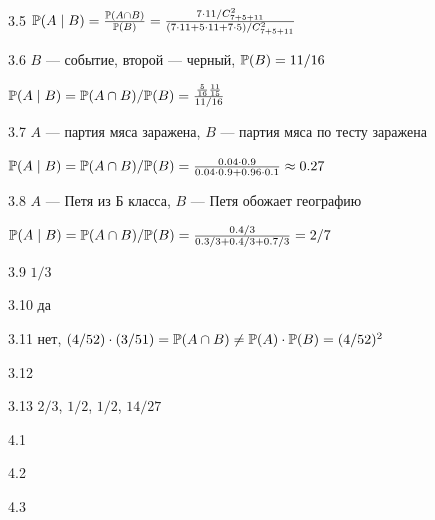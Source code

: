 \protect \hypertarget {soln:3.5}{}
\begin{solution}{{3.5}}
  $\P(A \mid B)=\frac{\P(A \cap B)}{\P(B)}= \frac{7\cdot 11 /C_{7+5+11}^2}{(7\cdot 11+5\cdot 11 + 7\cdot 5) /C_{7+5+11}^2 }$
\end{solution}
\protect \hypertarget {soln:3.6}{}
\begin{solution}{{3.6}}
  $B$ — событие, второй — черный, $\P(B)=11/16$

  $\P(A \mid B)=\P(A \cap B)/\P(B)=\frac{\frac{5}{16}\frac{11}{15}}{11/16}$
\end{solution}
\protect \hypertarget {soln:3.7}{}
\begin{solution}{{3.7}}
  $A$ — партия мяса заражена, $B$ — партия мяса по тесту заражена

  $\P(A \mid B)=\P(A \cap B)/\P(B)=\frac{0.04\cdot 0.9}{0.04\cdot 0.9+0.96\cdot 0.1}\approx 0.27$
\end{solution}
\protect \hypertarget {soln:3.8}{}
\begin{solution}{{3.8}}
  $A$ — Петя из Б класса, $B$ — Петя обожает географию

  $\P(A \mid B)=\P(A \cap B)/\P(B)=\frac{0.4/3}{0.3/3+0.4/3+0.7/3}=2/7$
\end{solution}
\protect \hypertarget {soln:3.9}{}
\begin{solution}{{3.9}}
  $1/3$
\end{solution}
\protect \hypertarget {soln:3.10}{}
\begin{solution}{{3.10}}
  да
\end{solution}
\protect \hypertarget {soln:3.11}{}
\begin{solution}{{3.11}}
  нет, $(4/52)\cdot (3/51)=\P(A\cap B) \neq \P(A)\cdot \P(B)=(4/52)^2$
\end{solution}
\protect \hypertarget {soln:3.12}{}
\begin{solution}{{3.12}}
\end{solution}
\protect \hypertarget {soln:3.13}{}
\begin{solution}{{3.13}}
$ 2/3 $, $1/2$, $ 1/2 $, $ 14/27 $
\end{solution}
\protect \hypertarget {soln:4.1}{}
\begin{solution}{{4.1}}
\end{solution}
\protect \hypertarget {soln:4.2}{}
\begin{solution}{{4.2}}
\end{solution}
\protect \hypertarget {soln:4.3}{}
\begin{solution}{{4.3}}
\end{solution}
